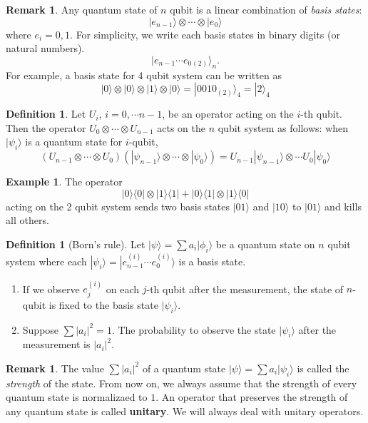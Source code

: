 \documentclass{beamer}
\theoremstyle{plain}
\theoremstyle{definition}
\newtheorem{defn}[thm]{Definition}
\newtheorem{exmp}[thm]{Example}
\newtheorem{rem}[thm]{Remark}
\begin{document}
\begin{frame}
\begin{rem}
Any quantum state of $n$ qubit is a linear combination of \textit{basis states}:
	$$|e_{n-1}\rangle\otimes\cdots\otimes|e_0\rangle$$
where $e_i = 0,1$.
For simplicity, we write each basis states in binary digits (or natural numbers).
	$$|e_{n-1}\cdots e_0{}_{(2)}\rangle_n.$$
For example, a basis state for 4 qubit system can be written as
	$$|0\rangle\otimes|0\rangle\otimes|1\rangle\otimes|0\rangle = |0010{}_{(2)}\rangle_4 = |2\rangle_4$$
\end{rem}
\end{frame}

\begin{frame}
\begin{defn}
Let $U_i$, $i=0,\cdots n-1$, be an operator acting on the $i$-th qubit.
Then the operator $U_0\otimes\cdots\otimes U_{n-1}$ acts on the $n$ qubit system as follows:
when $|\psi_i\rangle$ is a quantum state for $i$-qubit,
	$$(U_{n-1}\otimes\cdots\otimes U_0)(|\psi_{n-1}\rangle\otimes\cdots\otimes|\psi_0\rangle) = 
	U_{n-1}|\psi_{n-1}\rangle\otimes\cdots U_0|\psi_0\rangle$$
\end{defn}
\begin{exmp}
The operator 
	$$|0\rangle\langle0|\otimes|1\rangle\langle1| + |0\rangle\langle1|\otimes|1\rangle\langle0|$$
acting on the 2 qubit system sends two basis states $|01\rangle$ and $|10\rangle$ to $|01\rangle$
and kills all others.
\end{exmp}
\end{frame}

\begin{frame}
\begin{defn}[Born's rule]
Let $|\psi\rangle = \sum a_i|\phi_i\rangle$ be a quantum state on $n$ qubit system
where each $|\psi_i\rangle = |e_{n-1}^{(i)}\cdots e_0^{(i)}\rangle$ is a basis state.
\begin{enumerate}
	\item If we observe $e_j^{(i)}$ on each $j$-th qubit after the measurement, 
	the state of $n$-qubit is fixed to the basis state $|\psi_i\rangle$.
	\item Suppose $\sum |a_i|^2 = 1$. The probability to observe the state $|\psi_i\rangle$
	after the measurement is $|a_i|^2$.
\end{enumerate}
\end{defn}
\begin{rem}
The value $\sum|a_i|^2$ of a quantum state
$|\psi\rangle = \sum a_i|\psi_i\rangle$ 
is called the \textit{strength} of the state.
From now on, we always assume that the strength
of every quantum state is normalizaed to $1$.
An operator that preserves the strength of any quantum
state is called \textbf{unitary}.
We will always deal with unitary operators.
\end{rem}
\end{frame}
\end{document}
